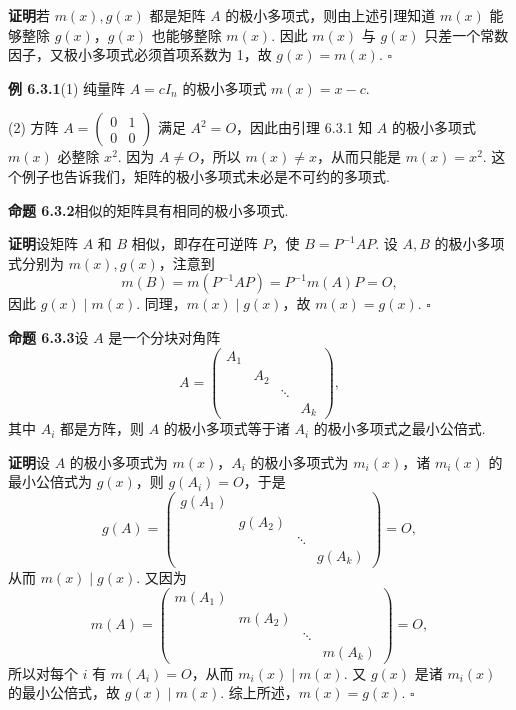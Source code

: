 \documentclass[UTF8,12pt,a4paper,fontset=fandol]{ctexart}
\begin{document}
\noindent\textbf{证明}\quad 若 $m(x),g(x)$ 都是矩阵 $A$ 的极小多项式，则由上述引理知道 $m(x)$ 能够整除 $g(x)$，$g(x)$ 也能够整除 $m(x)$. 因此 $m(x)$ 与 $g(x)$ 只差一个常数因子，又极小多项式必须首项系数为 1，故 $g(x)=m(x)$. $\square$

\noindent\textbf{例 6.3.1}\quad (1) 纯量阵 $A=cI_n$ 的极小多项式 $m(x)=x-c$.

(2) 方阵 $A=\left(\begin{array}{cc}0&1\\0&0\end{array}\right)$ 满足 $A^2=O$，因此由引理 6.3.1 知 $A$ 的极小多项式 $m(x)$ 必整除 $x^2$. 因为 $A\neq O$，所以 $m(x)\neq x$，从而只能是 $m(x)=x^2$. 这个例子也告诉我们，矩阵的极小多项式未必是不可约的多项式.

\noindent\textbf{命题 6.3.2}\quad 相似的矩阵具有相同的极小多项式.

\noindent\textbf{证明}\quad 设矩阵 $A$ 和 $B$ 相似，即存在可逆阵 $P$，使 $B=P^{-1}AP$. 设 $A,B$ 的极小多项式分别为 $m(x),g(x)$，注意到
\[
m(B)=m(P^{-1}AP)=P^{-1}m(A)P=O,
\]
因此 $g(x)\mid m(x)$. 同理，$m(x)\mid g(x)$，故 $m(x)=g(x)$. $\square$

\noindent\textbf{命题 6.3.3}\quad 设 $A$ 是一个分块对角阵
\[
A=\left(\begin{array}{cccc}
A_1 & & & \\
& A_2 & & \\
& & \ddots & \\
& & & A_k
\end{array}\right),
\]
其中 $A_i$ 都是方阵，则 $A$ 的极小多项式等于诸 $A_i$ 的极小多项式之最小公倍式.

\noindent\textbf{证明}\quad 设 $A$ 的极小多项式为 $m(x)$，$A_i$ 的极小多项式为 $m_i(x)$，诸 $m_i(x)$ 的最小公倍式为 $g(x)$，则 $g(A_i)=O$，于是
\[
g(A)=\left(\begin{array}{cccc}
g(A_1) & & & \\
& g(A_2) & & \\
& & \ddots & \\
& & & g(A_k)
\end{array}\right)=O,
\]
从而 $m(x)\mid g(x)$. 又因为
\[
m(A)=\left(\begin{array}{cccc}
m(A_1) & & & \\
& m(A_2) & & \\
& & \ddots & \\
& & & m(A_k)
\end{array}\right)=O,
\]
所以对每个 $i$ 有 $m(A_i)=O$，从而 $m_i(x)\mid m(x)$. 又 $g(x)$ 是诸 $m_i(x)$ 的最小公倍式，故 $g(x)\mid m(x)$. 综上所述，$m(x)=g(x)$. $\square$
\end{document}
